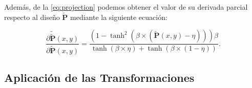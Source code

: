 Además, de la \autoref{eq:projection} podemos obtener el valor de su derivada parcial 
respecto al diseño $\widetilde{\boldsymbol{P}}$ mediante la siguiente ecuación:

\begin{equation}
  \frac{\partial\widetilde{\widetilde{\boldsymbol{P}}}(x, y)}{\partial \widetilde{\boldsymbol{P}}(x, y)} =
  \frac{(1 - \tanh^2 (\beta \times (\widetilde{\boldsymbol{P}}(x, y) - \eta))) \beta}
       {\tanh (\beta \times \eta) + \tanh (\beta \times (1 - \eta))}.
  \label{eq:projection-grad}
\end{equation}

\subsection{Aplicación de las Transformaciones}


